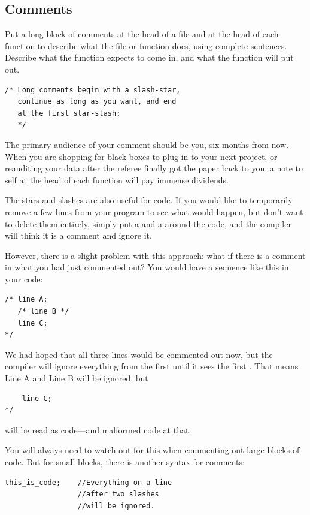 \documentclass[12pt]{article}
\begin{document}

\subsection{Comments} 
Put a long block of comments 
at the head of a file and at the head of each function to describe what
the file or function does, using complete sentences. Describe what the
function expects to come in, and what the function will put out.
\startonecol
\begin{verbatim}
/* Long comments begin with a slash-star,
   continue as long as you want, and end 
   at the first star-slash:   
   */
\end{verbatim}
\endonecol

The primary audience of your comment should be you, six months from
now. When you are shopping for black boxes to plug in to your next project,
or reauditing your data after the referee finally got the paper back
to you, a note to self at the head of each function will pay immense
dividends.


The stars and slashes are also useful for  code. If
you would
like to temporarily remove a few lines from your program to see what
would
happen, but don't want to delete them entirely, simply put a \ci{/*}
and a \ci{*/} around the code, and the compiler will think it is a
comment and ignore it.

However, there is a slight problem with this approach: what if there is a comment in what you had just
commented out? You would have a sequence like this in your code: 
\begin{lstlisting}
/* line A; 
   /* line B */ 
   line C; 
*/
\end{lstlisting}
We had hoped that all three lines would be commented out now, but the compiler will ignore everything
from the first \ci{/*} until it sees the first \ci{*/}. That means Line A and Line B will be ignored,
but 
\begin{lstlisting}
    line C; 
*/
\end{lstlisting}
will be read as code---and malformed code at that.

You will always need to watch out for this when commenting out large blocks of code. But for small
blocks, there is another syntax for comments:
\begin{verbatim}
this_is_code;    //Everything on a line 
                 //after two slashes 
                 //will be ignored.
\end{verbatim}
\end{document}
